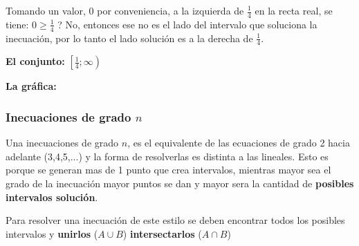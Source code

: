     Tomando un valor, 0 por conveniencia, a la izquierda de $\displaystyle\frac{1}{4}$
    en la recta real,
    se tiene: $\displaystyle0 \geq \frac{1}{4} $ ? No, entonces ese no es el lado del intervalo que
    soluciona la inecuación, por lo tanto el lado solución es a la derecha de
    $\displaystyle\frac{1}{4}$.


    \textbf{El conjunto:} $\displaystyle\left[\frac{1}{4}; \infty\right)$

    \textbf{La gráfica:}

    \vspace*{1cm}


\subsubsection*{Inecuaciones de grado $n$}
    Una inecuaciones de grado $n$, es el equivalente de las ecuaciones de grado
    2 hacia adelante (3,4,5,...) y la forma de resolverlas es distinta a las
    lineales. Esto es porque se generan mas de 1 punto que crea intervalos, mientras
    mayor sea el grado de la inecuación mayor puntos se dan y mayor sera la
    cantidad de \textbf{posibles intervalos solución}.

    Para resolver una inecuación de este estilo se deben encontrar todos los
    posibles intervalos y \textbf{unirlos} ($ A\cup B $)
    \textbf{intersectarlos} ($ A\cap B$)

